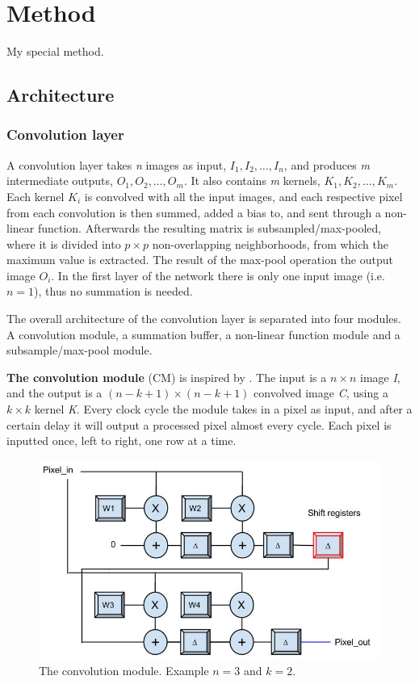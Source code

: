 \chapter{Method}

My special method. 

\section{Architecture}

\subsection {Convolution layer}

A convolution layer takes \textit{n} images as input, $ I_1, I_2, \dots, I_n $, and produces \textit{m} intermediate outputs, $O_1, O_2, \dots, O_m $. It also contains \textit{m} kernels, $ K_1, K_2, \dots, K_m $. Each kernel $ K_i $ is convolved with all the input images, and each respective pixel from each convolution is then summed, added a bias to, and sent through a non-linear function. Afterwards the resulting matrix is subsampled/max-pooled, where it is divided into $ p \times p $ non-overlapping neighborhoods, from which the maximum value is extracted. The result of the max-pool operation the output image $ O_i $. 
In the first layer of the network there is only one input image (i.e. $ n = 1 $), thus no summation is needed. 

The overall architecture of the convolution layer is separated into four modules. A convolution module, a summation buffer, a non-linear function module and a subsample/max-pool module.

\vspace*{1\baselineskip}
\textbf{The convolution module} (CM) is inspired by \cite{Farabet2009}. The input is a $ n \times n $ image \textit{I}, and the output is a $ (n-k+1) \times (n-k+1) $ convolved image \textit{C}, using a $ k \times k $ kernel \textit{K}. Every clock cycle the module takes in a pixel as input, and after a certain delay it will output a processed pixel almost every cycle. Each pixel is inputted once, left to right, one row at a time. 

\begin{figure}[h!]
  \centering
      \includegraphics[width=1.0\textwidth]{Figures/Method/Convolver}
  \caption{The convolution module. Example $ n = 3 $ and $ k = 2 $.}
\end{figure}

